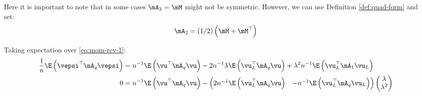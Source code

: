\documentclass[english,12pt]{book}\usepackage[]{graphicx}\usepackage[]{xcolor}
\begin{document}
Here it is important to note that in some cases $\mA_2 = \mM$ might not be symmetric. However, we can use Definition \ref{def:quad-form} and set:
\begin{equation}\label{eq:trick-A2}
\mA_2 = (1/2)\left(\mM + \mM^\top\right)
\end{equation}

Taking expectation over \eqref{eq:mom-rev-1}:
\begin{equation*}
  \begin{aligned}
 \frac{1}{n}\E\left(\vepsi^\top\mA_q\vepsi\right) & = n^{-1}\E\left(\vu^\top\mA_q\vu \right) - 2n^{-1}\lambda\E\left(\vu_L^\top\mA_q\vu\right) + \lambda^2n^{-1}\E\left(\vu_L^\top\mA_1\vu_L\right) \\
 0 & = n^{-1}\E\left(\vu^\top\mA_q\vu \right) - \begin{pmatrix}
                                                           2n^{-1}\E\left(\vu_L^\top\mA_q\vu\right) &   -n^{-1}\E\left(\vu_L^\top\mA_q\vu_L\right)  
                                                       \end{pmatrix}
                                                       \begin{pmatrix}
                                                        \lambda \\
                                                        \lambda^2
                                                       \end{pmatrix}
 \end{aligned}
\end{equation*}
\end{document}
